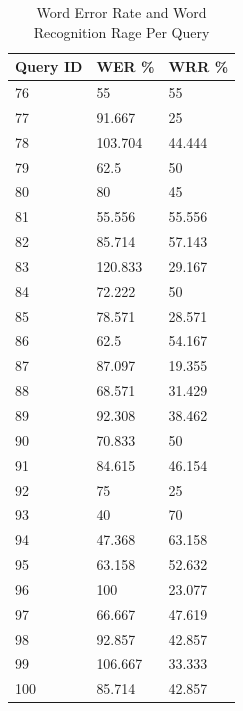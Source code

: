 \documentclass[jair, twoside,11pt,theapa]{article}
\begin{document}
\begin{table}[h!]
    \caption{Word Error Rate and Word Recognition Rage Per Query}
    \label{Table1}
    \begin{minipage}{.5\linewidth}
        \centering
        \begin{tabular}{|l|l|l|}
        \hline
        Query ID & WER \%    & WRR \%    \\ \hline
        76       & 55      & 55      \\ \hline
        77       & 91.667  & 25      \\ \hline
        78       & 103.704 & 44.444  \\ \hline
        79       & 62.5    & 50      \\ \hline
        80       & 80      & 45      \\ \hline
        81       & 55.556  & 55.556  \\ \hline
        82       & 85.714  & 57.143  \\ \hline
        83       & 120.833 & 29.167  \\ \hline
        84       & 72.222  & 50      \\ \hline
        85       & 78.571  & 28.571  \\ \hline
        86       & 62.5    & 54.167  \\ \hline
        87       & 87.097  & 19.355  \\ \hline
        88       & 68.571  & 31.429  \\ \hline
        89       & 92.308  & 38.462  \\ \hline
        90       & 70.833  & 50      \\ \hline
        91       & 84.615  & 46.154  \\ \hline
        92       & 75      & 25      \\ \hline
        93       & 40      & 70      \\ \hline
        94       & 47.368  & 63.158  \\ \hline
        95       & 63.158  & 52.632  \\ \hline
        96       & 100     & 23.077  \\ \hline
        97       & 66.667  & 47.619  \\ \hline
        98       & 92.857  & 42.857  \\ \hline
        99       & 106.667 & 33.333  \\ \hline
        100      & 85.714  & 42.857  \\ \hline
        \end{tabular}

\end{minipage}
\end{table}
\end{document}
